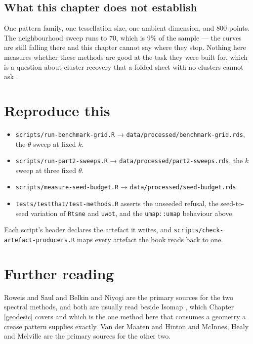 \documentclass[
  british,
  a4paper,
]{book}
\providecommand{\tightlist}{%
  \setlength{\itemsep}{0pt}\setlength{\parskip}{0pt}}
\begin{document}
\subsection{What this chapter does not establish}\label{what-this-chapter-does-not-establish}

One pattern family, one tessellation size, one ambient dimension, and
800 points. The neighbourhood sweep runs to 70, which is
9\% of the sample --- the curves are still
falling there and this chapter cannot say where they stop. Nothing here
measures whether these methods are good at the task they were built for, which
is a question about cluster recovery that a folded sheet with no clusters
cannot ask \citep{espadoto2021survey}.

\section{Reproduce this}\label{nbr-reproduce}

\begin{itemize}
\tightlist
\item
  \texttt{scripts/run-benchmark-grid.R} → \texttt{data/processed/benchmark-grid.rds}, the
  \(\theta\) sweep at fixed \(k\).
\item
  \texttt{scripts/run-part2-sweeps.R} → \texttt{data/processed/part2-sweeps.rds}, the \(k\)
  sweep at three fixed \(\theta\).
\item
  \texttt{scripts/measure-seed-budget.R} → \texttt{data/processed/seed-budget.rds}.
\item
  \texttt{tests/testthat/test-methods.R} asserts the unseeded refusal, the
  seed-to-seed variation of \texttt{Rtsne} and \texttt{uwot}, and the \texttt{umap::umap}
  behaviour above.
\end{itemize}

Each script's header declares the artefact it writes, and
\texttt{scripts/check-artefact-producers.R} maps every artefact the book reads back to
one.

\section{Further reading}\label{nbr-reading}

Roweis and Saul \citep{roweis2000lle} and Belkin and Niyogi \citep{belkin2003laplacian}
are the primary sources for the two spectral methods, and both are usually read
beside Isomap \citep{tenenbaum2000isomap}, which Chapter \ref{geodesic} covers and
which is the one method here that consumes a geometry a crease pattern supplies
exactly. Van der Maaten and Hinton \citep{vandermaaten2008tsne} and
McInnes, Healy and Melville \citep{mcinnes2018umap} are the primary sources for the
other two.
\end{document}
